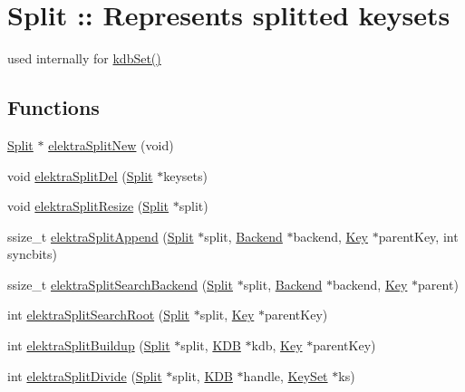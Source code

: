 \hypertarget{group__split}{
\section{Split :: Represents splitted keysets}
\label{group__split}
}


used internally for \hyperlink{group__kdb_ga11436b058408f83d303ca5e996832bcf}{kdbSet()}  


\subsection*{Functions}
\begin{DoxyCompactItemize}
\item 
\hyperlink{struct__Split}{Split} $\ast$ \hyperlink{group__split_gad2245a38809f28e325cd9b32089b4c68}{elektraSplitNew} (void)
\item 
void \hyperlink{group__split_gae569ef1bc4cd8e931b4a7840d8ce48e6}{elektraSplitDel} (\hyperlink{struct__Split}{Split} $\ast$keysets)
\item 
void \hyperlink{group__split_ga9816931521a6a16bd553c08abb957c62}{elektraSplitResize} (\hyperlink{struct__Split}{Split} $\ast$split)
\item 
ssize\_\-t \hyperlink{group__split_ga0c8c5c6c26aa42404d8aa06e6476a0f6}{elektraSplitAppend} (\hyperlink{struct__Split}{Split} $\ast$split, \hyperlink{struct__Backend}{Backend} $\ast$backend, \hyperlink{struct__Key}{Key} $\ast$parentKey, int syncbits)
\item 
ssize\_\-t \hyperlink{group__split_ga887dd183bf21c635c6993cd480ff3b21}{elektraSplitSearchBackend} (\hyperlink{struct__Split}{Split} $\ast$split, \hyperlink{struct__Backend}{Backend} $\ast$backend, \hyperlink{struct__Key}{Key} $\ast$parent)
\item 
int \hyperlink{group__split_gafb25e1f946f07e5490a962a42320a0cc}{elektraSplitSearchRoot} (\hyperlink{struct__Split}{Split} $\ast$split, \hyperlink{struct__Key}{Key} $\ast$parentKey)
\item 
int \hyperlink{group__split_gaabebbc4b0e47527f59942fcf95b9fcb5}{elektraSplitBuildup} (\hyperlink{struct__Split}{Split} $\ast$split, \hyperlink{struct__KDB}{KDB} $\ast$kdb, \hyperlink{struct__Key}{Key} $\ast$parentKey)
\item 
int \hyperlink{group__split_ga447e430a045cef7b107762171fbdc104}{elektraSplitDivide} (\hyperlink{struct__Split}{Split} $\ast$split, \hyperlink{struct__KDB}{KDB} $\ast$handle, \hyperlink{struct__KeySet}{KeySet} $\ast$ks)

\end{DoxyCompactItemize}

